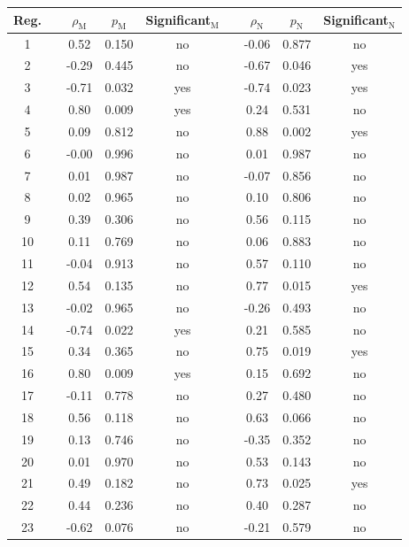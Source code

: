 \documentclass[12pt,a4paper]{article}
\begin{document}
\begin{appendices}
\begin{table}[H] 
	\centering
	\begin{tabular}{ccccccccc}
		Reg. && $\rho_\mathrm{M}$ & $p_\mathrm{M}$ & Significant$_\mathrm{M}$ && $\rho_\mathrm{N}$ & $p_\mathrm{N}$ & Significant$_\mathrm{N}$ \\
		\hline 
		1 && 0.52 & 0.150 & no && -0.06 & 0.877 & no \\
		\rowcolor{lightgray} 2 && -0.29 & 0.445 & no && -0.67 & 0.046 & yes \\
		\rowcolor{teal} 3 && -0.71 & 0.032 & yes && -0.74 & 0.023 & yes \\
		\rowcolor{lightgray} 4 && 0.80 & 0.009 & yes && 0.24 & 0.531 & no \\
		\rowcolor{lightgray} 5 && 0.09 & 0.812 & no && 0.88 & 0.002 & yes \\
		6 && -0.00 & 0.996 & no && 0.01 & 0.987 & no \\ 
		7 && 0.01 & 0.987 & no && -0.07 & 0.856 & no \\
		8 && 0.02 & 0.965 & no && 0.10 & 0.806 & no \\
		9 && 0.39 & 0.306 & no && 0.56 & 0.115 & no \\
		10 && 0.11 & 0.769 & no && 0.06 & 0.883 & no \\
		11 && -0.04 & 0.913 & no && 0.57 & 0.110 & no \\
		\rowcolor{lightgray} 12 && 0.54 & 0.135 & no && 0.77 & 0.015 & yes \\
		13 && -0.02 & 0.965 & no && -0.26 & 0.493 & no \\
		\rowcolor{lightgray} 14 && -0.74 & 0.022 & yes && 0.21 & 0.585 & no \\
		\rowcolor{lightgray} 15 && 0.34 & 0.365 & no && 0.75 & 0.019 & yes \\
		\rowcolor{lightgray} 16 && 0.80 & 0.009 & yes && 0.15 & 0.692 & no \\ 
		17 && -0.11 & 0.778 & no && 0.27 & 0.480 & no \\
		18 && 0.56 & 0.118 & no && 0.63 & 0.066 & no \\
		19 && 0.13 & 0.746 & no && -0.35 & 0.352 & no \\
		20 && 0.01 & 0.970 & no && 0.53 & 0.143 & no \\
		\rowcolor{lightgray} 21 && 0.49 & 0.182 & no && 0.73 & 0.025 & yes \\
		22 && 0.44 & 0.236 & no && 0.40 & 0.287 & no \\
		23 && -0.62 & 0.076 & no && -0.21 & 0.579 & no \\

\end{tabular}
\end{table}
\end{appendices}
\end{document}
